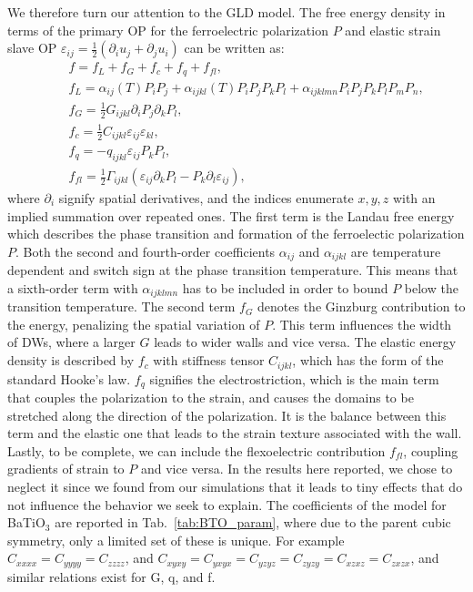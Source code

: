 We therefore turn our attention to the \gls{GLD} model.
The free energy density in terms of the primary \gls{OP} for the ferroelectric polarization $P$ and elastic strain slave \gls{OP} $\varepsilon_{ij} = \frac{1}{2}(\partial_i u_j + \partial_j u_i)$ can be written as:
\begin{eqnarray}\label{eq:BTO_energy}
&&f = f_{L}+f_{G}+f_{c}+f_{q}+f_{fl},\\
&&f_{L} = \alpha_{ij}(T)P_iP_j + \alpha_{ijkl}(T)P_{i}P_{j}P_{k}P_{l} + \alpha_{ijklmn} P_i P_j P_k P_l P_m P_n,\\
&&f_{G} = \frac{1}{2}G_{ijkl}\partial_i P_j\partial_k P_l,\\
&&f_{c} = \frac{1}{2}C_{ijkl}\varepsilon_{ij}\varepsilon_{kl},\\
&&f_{q}= - q_{ijkl}\varepsilon_{ij}P_{k}P_{l},\\
&&f_{fl}=\frac{1}{2}\Gamma_{ijkl}(\varepsilon_{ij}\partial_k P_l - P_k\partial_l\varepsilon_{ij}),
\end{eqnarray}
where $\partial_i$ signify spatial derivatives, and the indices enumerate ${x,y,z}$ with an implied summation over repeated ones.
The first term is the Landau free energy which describes the phase transition and formation of the ferroelectic polarization $P$.
Both the second and fourth-order coefficients $\alpha_{ij}$ and $\alpha_{ijkl}$ are temperature dependent and switch sign at the phase transition temperature.
This means that a sixth-order term with $\alpha_{ijklmn}$ has to be included in order to bound $P$ below the transition temperature.
The second term $f_G$ denotes the Ginzburg contribution to the energy, penalizing the spatial variation of $P$.  
This term influences the width of \glspl{DW}, where a larger $G$ leads to wider walls and vice versa.
The elastic energy density is described by $f_c$ with stiffness tensor $C_{ijkl}$, which has the form of the standard Hooke's law.
$f_q$ signifies the electrostriction, which is the main term that couples the polarization to the strain, and causes the domains to be stretched along the direction of the polarization.
It is the balance between this term and the elastic one that leads to the strain texture associated with the wall.
Lastly, to be complete, we can include the flexoelectric contribution $f_{fl}$, coupling gradients of strain to $P$ and vice versa.
In the results here reported, we chose to neglect it since we found from our simulations that it leads to tiny effects that do not influence the behavior we seek to explain.
The coefficients of the model for BaTiO$_3$ are reported in Tab.~\ref{tab:BTO_param}, where due to the parent cubic symmetry, only a limited set of these is unique.
For example $C_{xxxx} = C_{yyyy} = C_{zzzz}$, and $C_{xyxy} = C_{yxyx} = C_{yzyz} = C_{zyzy} = C_{xzxz} = C_{zxzx}$, and similar relations exist for G, q, and f. 

